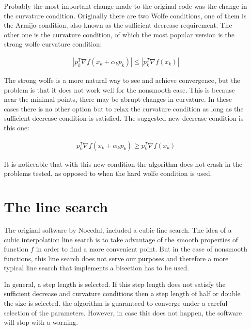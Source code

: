 Probably the most important change made to the original code was the change in the curvature condition. Originally there are two Wolfe conditions, one of them is the Armijo condition, also known as the sufficient decrease requirement. The other one is the curvature condition, of which the most popular version is the strong wolfe curvature condition:

\begin{equation}
  \begin{aligned}
    |p_k^T \nabla f(x_k + \alpha _k p_k)| \leq |p_k^T \nabla f(x_k)|
  \end{aligned}
\end{equation}

The strong wolfe is a more natural way to see and achieve convergence, but the problem is that it does not work well for the nonsmooth case. This is because near the minimal points, there may be abrupt changes in curvature. In these cases there is no other option but to relax the curvature condition as long as the sufficient decrease condition is satisfied. The suggested new decrease condition is this one:

\begin{equation}
  \begin{aligned}
    p_k^T \nabla f(x_k + \alpha _k p_k) \geq p_k^T \nabla f(x_k)
  \end{aligned}
\end{equation}

It is noticeable that with this new condition the algorithm does not crash in the problems tested, as opposed to when the hard wolfe condition is used.

\section{The line search}

The original software by Nocedal\citep{lbfgsbsoftware}, included a cubic line search. The idea of a cubic interpolation line search is to take advantage of the smooth properties of function $f$ in order to find a more convenient point. But in the case of nonsmooth functions, this line search does not serve our purposes and therefore a more typical line search that implements a bisection has to be used.

In general, a step length is selected. If this step length does not satisfy the sufficient decrease and curvature conditions then a step length of half or double the size is selected. the algorithm is guaranteed to converge under a careful selection of the parameters. However, in case this does not happen, the software will stop with a warning.

